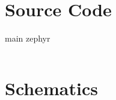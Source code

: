 \chapter{Source Code}
\newenvironment{longlisting}{\captionsetup{type=listing}}{}
\begin{longlisting}
	\caption{main zephyr}
	\label{lst:zephyr}
	\inputminted[bgcolor=LightGray,fontsize=\footnotesize,linenos]{c}{Figures/Code/main.c}
\end{longlisting}

\chapter{Schematics}
\begin{landscape}
	\begin{figure}[htbp]
		\centering

\end{figure}
\end{landscape}
